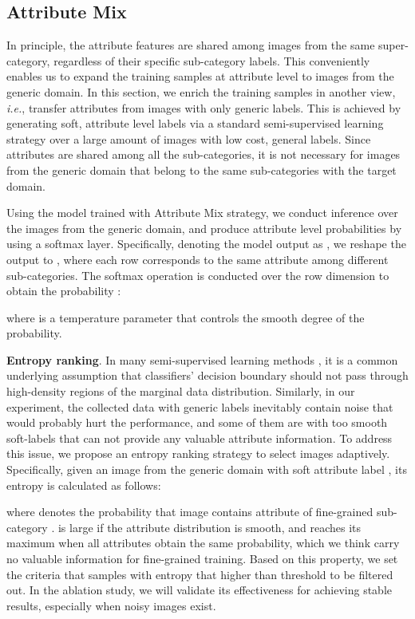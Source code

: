 \documentclass[runningheads]{llncs}
\begin{document}
\subsection{Attribute Mix}
\label{sec_attribute_transfer}
\noindent In principle, the attribute features are shared among images from the same super-category, regardless of their specific sub-category labels. This conveniently enables us to expand the training samples at attribute level to images from the generic domain. In this section, we enrich the training samples in another view, \emph{i.e.}, transfer attributes from images with only generic labels. This is achieved by generating soft, attribute level labels via a standard semi-supervised learning strategy over a large amount of images with low cost, general labels. Since attributes are shared among all the sub-categories, it is not necessary for images from the generic domain that belong to the same sub-categories with the target domain.

Using the model trained with Attribute Mix strategy, we conduct inference over the images from the generic domain, and produce attribute level probabilities by using a softmax layer. Specifically, denoting the model output as , we reshape the output to , where each row corresponds to the same attribute among different sub-categories. The softmax operation is conducted over the row dimension to obtain the probability :


where  is a temperature parameter that controls the smooth degree of the probability.

 \textbf{Entropy ranking}.
In many semi-supervised learning methods \cite{grandvalet2005semi,berthelot2019mixmatch,lee2013pseudo,miyato2018virtual}, it is a common underlying assumption that classifiers' decision boundary should not pass through high-density regions of the marginal data distribution. Similarly, in our experiment, the collected data with generic labels inevitably contain noise that would probably hurt the performance, and some of them are with too smooth soft-labels that can not provide any valuable attribute information. To address this issue, we propose an entropy ranking strategy to select images adaptively. Specifically, given an image  from the generic domain with soft attribute label , its entropy is calculated as follows:


where  denotes the probability that image  contains attribute  of fine-grained sub-category .  is large if the attribute distribution is smooth, and reaches its maximum when all attributes obtain the same probability, which we think carry no valuable information for fine-grained training.  Based on this property, we set the criteria that samples with entropy  that higher than threshold  to be filtered out.  In the ablation study, we will validate its effectiveness for achieving stable results, especially when noisy images exist.
\end{document}
